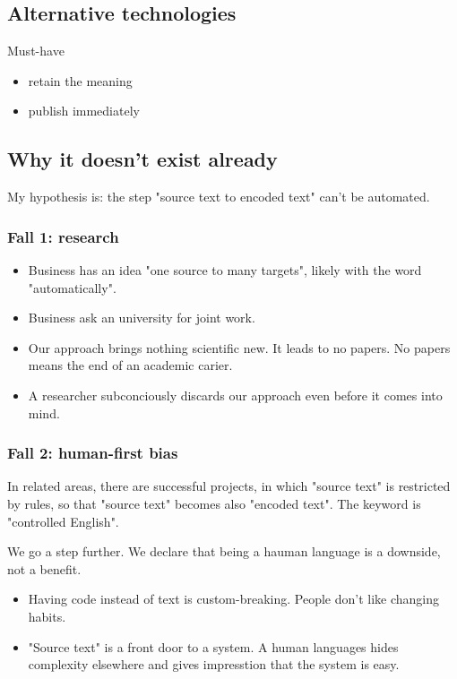\documentclass{article}
\begin{document}
\subsection{Alternative technologies}

Must-have

\begin{itemize}
\item retain the meaning
\item publish immediately
\end{itemize}

\subsection{Why it doesn't exist already}

My hypothesis is: the step "source text to encoded text" can't be automated.

\subsubsection{Fall 1: research}

\begin{itemize}
\item Business has an idea "one source to many targets", likely with the word "automatically".
\item Business ask an university for joint work.
\item Our approach brings nothing scientific new. It leads to no papers. No papers means the end of an academic carier.
\item A researcher subconciously discards our approach even before it comes into mind.
\end{itemize}

\subsubsection{Fall 2: human-first bias}

In related areas, there are successful projects, in which "source text" is restricted by rules, so that "source text" becomes also "encoded text". The keyword is "controlled English".

We go a step further. We declare that being a hauman language is a downside, not a benefit.

\begin{itemize}
\item Having code instead of text is custom-breaking. People don't like changing habits.
\item "Source text" is a front door to a system. A human languages hides complexity elsewhere and gives impresstion that the system is easy.
\end{itemize}
\end{document}
